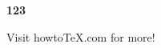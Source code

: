\documentclass{article}
\newcommand{\concept}[1]{\textbf{#1}}
\begin{document}
	\concept{123}
	
Visit howto\TeX.com for more!
\end{document}

